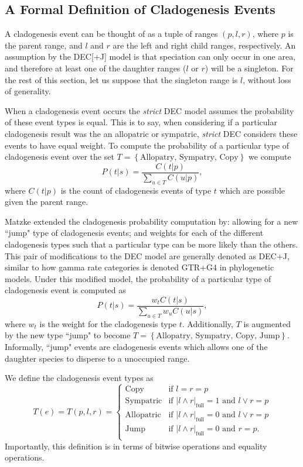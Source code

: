 \documentclass{article}
\newcommand{\CountFull}[1]{|#1|_\text{full}}
\newcommand{\rand}[2]{#1 \land #2}
\newcommand{\ror}[2]{#1 \lor #2}
\begin{document}
\subsection{A Formal Definition of Cladogenesis Events}
\label{sec:formal-cladogenesis}

A cladogenesis event can be thought of as a tuple of ranges $(p, l, r)$, where
$p$ is the parent range, and $l$ and $r$ are the left and right child ranges,
respectively. 
An assumption by the DEC[+J] model is that speciation can only occur in one
area, and therefore at least one of the daughter ranges ($l$ or $r$) will be a
singleton.
For the rest of this section, let us suppose that the singleton range is $l$,
without loss of generality.

When a cladogenesis event occurs the \textit{strict} DEC model assumes the
probability of these event types is equal.
This is to say, when considering if a particular cladogenesis result was the
an allopatric or sympatric, \textit{strict} DEC considers these events to
have equal weight.
To compute the probability of a particular type of cladogenesis event over the
set \(T = \left\{\text{Allopatry, Sympatry, Copy}\right\}\) we compute
\[
	P(t |
	s) = \frac{C(t | p)}{\sum_{u \in T} C(u | p)},
\]
where \( C(t|p) \) is the
count of cladogenesis events of type $ t $ which are possible given the parent
range.

Matzke\cite{ModelSelectionMatzke2014} extended the cladogenesis probability
computation by: allowing for a new ``jump" type of cladogenesis events; and
weights for each of the different cladogenesis types such that a particular
type can be more likely than the others.
This pair of modifications to the DEC model are generally denoted as DEC+J,
similar to how gamma rate categories is denoted GTR+G4 in phylogenetic models.
Under this modified model, the probability of a particular type of cladogenesis
event is computed as
\begin{equation}
	P(t | s) = \frac{w_t C(t | s)}{\sum_{u \in T} w_u C(u |
		s)},
\end{equation}
where $w_t$ is the weight for the cladogenesis type $t$.
Additionally, $T$ is augmented by the new type ``jump" to become \(T =
\left\{\text{Allopatry, Sympatry, Copy, Jump}\right\} \).
Informally, ``jump" events are cladogenesis events which allows one of the
daughter species to disperse to a unoccupied range.

We define the cladogenesis event types as
\begin{equation}
T(e) = T(p, l, r) = 
\begin{cases}
  \text{Copy} & \text{if }l = r = p \\ 
  \text{Sympatric} & \text{if } \CountFull{\rand{l}{r}} = 1 \text{ and } \ror{l}{r} = p \\ 
  \text{Allopatric} & \text{if } \CountFull{\rand{l}{r}} = 0 \text{ and } \ror{l}{r} = p   \\ 
  \text{Jump} & \text{if } \CountFull{\rand{l}{r}} = 0 \text{ and } r = p. \\ 
\end{cases}
\label{eq:clad-test}
\end{equation}
Importantly, this definition is in terms of bitwise operations and equality
operations.
\end{document}
